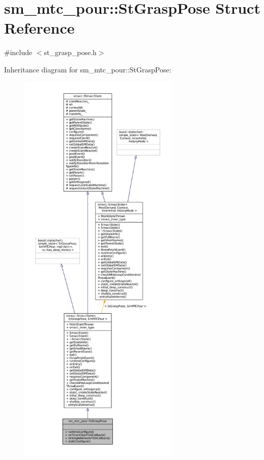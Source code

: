 \hypertarget{structsm__mtc__pour_1_1StGraspPose}{}\section{sm\+\_\+mtc\+\_\+pour\+:\+:St\+Grasp\+Pose Struct Reference}
\label{structsm__mtc__pour_1_1StGraspPose}


{\ttfamily \#include $<$st\+\_\+grasp\+\_\+pose.\+h$>$}



Inheritance diagram for sm\+\_\+mtc\+\_\+pour\+:\+:St\+Grasp\+Pose\+:
\nopagebreak
\begin{figure}[H]
\begin{center}
\leavevmode
\includegraphics[height=550pt]{structsm__mtc__pour_1_1StGraspPose__inherit__graph}
\end{center}
\end{figure}


